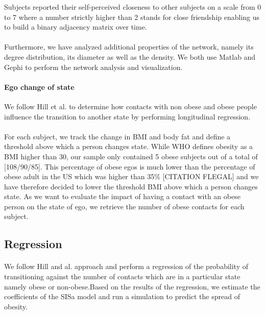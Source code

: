 \documentclass[11pt]{article}
\begin{document}
Subjects reported their self-perceived closeness to other subjects on a scale from 0 to 7 where a number strictly higher than 2 stands for close friendship enabling us to build a binary adjacency matrix over time.

\paragraph{}

Furthermore, we have analyzed additional properties of the network, namely its degree distribution, its diameter as well as the density. We both use Matlab and Gephi to perform the network analysis and visualization.

\paragraph{Ego change of state}

We follow Hill et al. to determine how contacts with non obese and obese people influence the transition to another state by performing longitudinal regression. 
\paragraph{}
For each subject, we track the change in BMI and body fat and define a threshold above which a person changes state. While WHO defines obesity as a BMI higher than 30, our sample only contained 5 obese subjects out of a total of [108/90/85]. This percentage of obese egos is much lower than the percentage of obese adult in the US which was higher than 35\% [CITATION FLEGAL] and we have therefore decided to lower the threshold BMI above which a person changes state. As we want to evaluate the impact of having a contact with an obese person  on the state of ego, we retrieve the number of obese contacts for each subject.

\subsection{Regression}
\paragraph{}
We follow Hill and al. approach and perform a regression of the probability of transitioning against the number of contacts which are in a particular state namely obese or non-obese.Based on the results of the regression, we estimate the coefficients of the SISa model and run a simulation to predict the spread of obesity.
\end{document}
